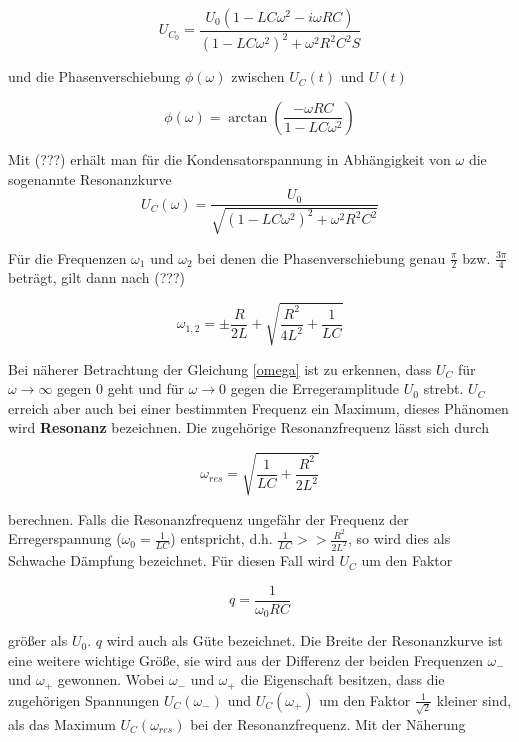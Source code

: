  \begin{equation}
   \label{equation1}
   U_{C_0} = \frac{U_0 (1 - LC \omega^2 - i \omega RC)}{(1 - LC \omega^2)^2 + \omega^2 R^2 C^2 S}
 \end{equation}

 und die Phasenverschiebung $\phi (\omega)$ zwischen $U_C(t)$ und $U(t)$

 \begin{equation}
 \label{winkel}
   \phi(\omega) = \arctan \left(\frac{- \omega RC}{1 - LC \omega^2}\right)
 \end{equation}

Mit (???) erhält man für die Kondensatorspannung in Abhängigkeit von $\omega$ die sogenannte Resonanzkurve
\begin{equation}
  \label{omega}
  U_C(\omega) = \frac{U_0}{\sqrt{(1-LC \omega^2)^2 + \omega^2 R^2 C^2}}
\end{equation}

Für die Frequenzen $\omega_1$ und $\omega_2$ bei denen die Phasenverschiebung genau $\frac{\pi}{2}$ bzw. $\frac{3 \pi}{4}$
beträgt, gilt dann nach (???)

\begin{equation*}
  \omega_{1,2} = \pm \frac{R}{2L} + \sqrt{\frac{R^2}{4L^2} + \frac{1}{LC}}
\end{equation*}

Bei näherer Betrachtung der Gleichung \eqref{omega} ist zu erkennen, dass $U_C$ für $\omega \to \infty$ gegen 0 geht
und für $\omega \to 0$ gegen die Erregeramplitude $U_0$ strebt. $U_C$ erreich aber auch bei einer bestimmten Frequenz
ein Maximum, dieses Phänomen wird \textbf{Resonanz} bezeichnen. Die zugehörige Resonanzfrequenz lässt sich durch

\begin{equation*}
  \omega_{res} = \sqrt{\frac{1}{LC} + \frac{R^2}{2L^2}}
\end{equation*}

berechnen. Falls die Resonanzfrequenz ungefähr der Frequenz der Erregerspannung ($\omega_0 = \frac{1}{LC}$) entspricht, d.h.
$ \frac{1}{LC} >> \frac{R^2}{2L^2} $, so wird dies als Schwache Dämpfung bezeichnet. Für diesen Fall wird $U_C$ um
den Faktor

\begin{equation*}
  q = \frac{1}{\omega_0 RC}
\end{equation*}

 größer als $U_0$. $q$ wird auch als Güte bezeichnet. Die Breite der Resonanzkurve ist eine weitere wichtige Größe,
 sie wird aus der Differenz der beiden Frequenzen $\omega_-$ und $\omega_+$ gewonnen. Wobei $\omega_-$ und $\omega_+$
 die Eigenschaft besitzen, dass die zugehörigen Spannungen $U_C(\omega_-)$ und $U_C(\omega_+)$  um den Faktor
 $\frac{1}{\sqrt{2}}$ kleiner sind, als das Maximum $U_C(\omega_{res})$ bei der Resonanzfrequenz.
 Mit der Näherung

